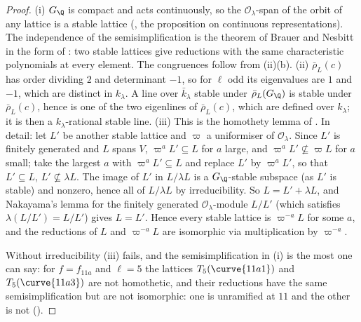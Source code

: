 \begin{proof}
(i) $G_\Q$ is compact and acts continuously, so the $\mathcal{O}_\lambda$-span of the orbit of any lattice is a stable lattice (, the proposition
on continuous representations). The independence of the semisimplification is the theorem of Brauer and Nesbitt in the form of
: two stable lattices give reductions with the same characteristic polynomials at every element. The congruences follow from
(ii)(b). (ii) $\bar\rho_L(c)$ has order dividing $2$ and determinant $-1$, so for $\ell$ odd its eigenvalues are $1$
and $-1$, which are distinct in $k_\lambda$. A line over $\bar k_\lambda$ stable under $\bar\rho_L(G_\Q)$ is stable under $\bar\rho_L(c)$, hence is one of the two
eigenlines of $\bar\rho_L(c)$, which are defined over $k_\lambda$; it is then a $k_\lambda$-rational stable line. (iii) This is the homothety lemma of
. In detail: let $L'$ be another stable lattice and $\varpi$ a uniformiser of $\mathcal{O}_\lambda$. Since $L'$ is finitely generated and $L$ spans $V$, $\varpi^aL'\subseteq L$
for $a$ large, and $\varpi^aL'\not\subseteq\varpi L$ for $a$ small; take the largest $a$ with $\varpi^aL'\subseteq L$ and replace $L'$ by $\varpi^aL'$, so that $L'\subseteq L$, $L'\not\subseteq\lambda L$. The image of
$L'$ in $L/\lambda L$ is a $G_\Q$-stable subspace (as $L'$ is stable) and nonzero, hence all of $L/\lambda L$ by irreducibility. So $L=L'+\lambda L$, and Nakayama's lemma for the
finitely generated $\mathcal{O}_\lambda$-module $L/L'$ (which satisfies $\lambda(L/L')=L/L'$) gives $L=L'$. Hence every stable lattice is $\varpi^{-a}L$ for some $a$, and the reductions of
$L$ and $\varpi^{-a}L$ are isomorphic via multiplication by $\varpi^{-a}$.

Without irreducibility (iii) fails, and the semisimplification in (i) is the most one can say: for $f=f_{11a}$ and $\ell=5$ the lattices $T_5(\curve{11a1})$ and $T_5(\curve{11a3})$ are not
homothetic, and their reductions have the same semisimplification but are not isomorphic: one is unramified at $11$ and the other is not
().
\end{proof}

